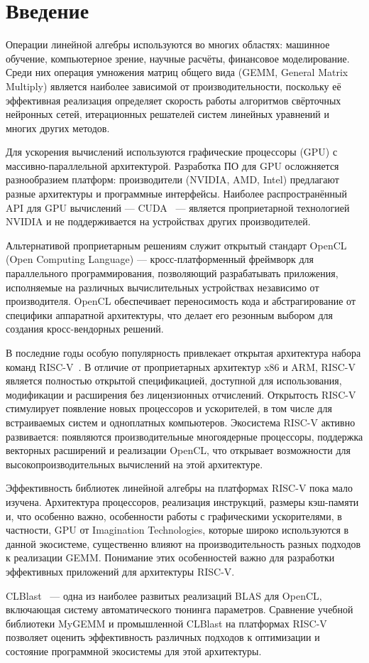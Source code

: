
\section*{Введение}
\thispagestyle{withCompileDate}

Операции линейной алгебры используются во многих областях: машинное обучение, компьютерное зрение, научные расчёты, финансовое моделирование. Среди них операция умножения матриц общего вида (GEMM, General Matrix Multiply) является наиболее зависимой от производительности, поскольку её эффективная реализация определяет скорость работы алгоритмов свёрточных нейронных сетей, итерационных решателей систем линейных уравнений и многих других методов.

Для ускорения вычислений используются графические процессоры (GPU) с массивно-параллельной архитектурой. Разработка ПО для GPU осложняется разнообразием платформ: производители (NVIDIA, AMD, Intel) предлагают разные архитектуры и программные интерфейсы. Наиболее распространённый API для GPU вычислений --- CUDA~\cite{nickolls2008cuda} --- является проприетарной технологией NVIDIA и не поддерживается на устройствах других производителей.

Альтернативой проприетарным решениям служит открытый стандарт OpenCL~\cite{opencl_spec} (Open Computing Language) --- кросс-платформенный фреймворк для параллельного программирования, позволяющий разрабатывать приложения, исполняемые на различных вычислительных устройствах независимо от производителя. OpenCL обеспечивает переносимость кода и абстрагирование от специфики аппаратной архитектуры, что делает его резонным выбором для создания кросс-вендорных решений.

В последние годы особую популярность привлекает открытая архитектура набора команд RISC-V~\cite{waterman2014risc}. В отличие от проприетарных архитектур x86 и ARM, RISC-V является полностью открытой спецификацией, доступной для использования, модификации и расширения без лицензионных отчислений. Открытость RISC-V стимулирует появление новых процессоров и ускорителей, в том числе для встраиваемых систем и одноплатных компьютеров. Экосистема RISC-V активно развивается: появляются производительные многоядерные процессоры, поддержка векторных расширений и реализации OpenCL, что открывает возможности для высокопроизводительных вычислений на этой архитектуре.

Эффективность библиотек линейной алгебры на платформах RISC-V пока мало изучена. Архитектура процессоров, реализация инструкций, размеры кэш-памяти и, что особенно важно, особенности работы с графическими ускорителями, в частности, GPU от Imagination Technologies, которые широко используются в данной экосистеме, существенно влияют на производительность разных подходов к реализации GEMM. Понимание этих особенностей важно для разработки эффективных приложений для архитектуры RISC-V.

CLBlast~\cite{clblast} — одна из наиболее развитых реализаций BLAS для OpenCL, включающая систему автоматического тюнинга параметров. Сравнение учебной библиотеки MyGEMM и промышленной CLBlast на платформах RISC-V позволяет оценить эффективность различных подходов к оптимизации и состояние программной экосистемы для этой архитектуры.